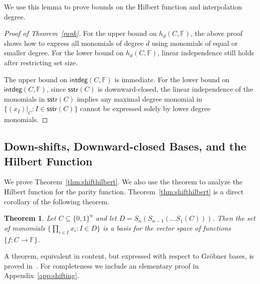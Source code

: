 \documentclass[11pt]{article}
\newtheorem{theorem}{Theorem}[section]
\theoremstyle{definition}
\newcommand{\1}{\mathbf{1}}
\newcommand{\F}{{\mathbb F}}
\newcommand{\sstr}{\mathsf{sstr}}
\newcommand{\setof}[1]{#1}
\newcommand{\intdeg}{\mathsf{intdeg}}
\begin{document}
We use this lemma to prove bounds on the Hilbert function and interpolation degree. 
\begin{proof}[Proof of Theorem~\ref{rank}]   For the upper bound on $h_d(C,\F)$, the above proof shows how to express all monomials of degree $d$ using monomials of equal or smaller degree.   For the lower bound on $h_d(C,\F)$,  linear independence still holds after restricting set size. 

The upper bound on $\intdeg(C,\F)$ is immediate. For the lower bound on $\intdeg(C,\F)$,  since $\sstr(C)$ is downward-closed, the linear independence of the monomials in $\sstr(C)$ implies any maximal degree monomial in $\{(x_I)|_C : I\in\sstr(C)\}$ cannot be expressed solely by  lower degree monomials.  
\end{proof}


\subsection{Down-shifts, Downward-closed Bases, and the Hilbert Function}\label{sec:shift}


We prove Theorem~\ref{thm:shifthilbert}.  
We also use the theorem to analyze the Hilbert function for the parity function. 
Theorem~\ref{thm:shifthilbert} is a direct corollary of the following theorem.
\begin{theorem}\label{thm:shifting}
Let $C\subseteq\{0,1\}^n$ and let $D=S_{n}(S_{n-1}(\ldots S_{1}(C)))$.
Then the set of monomials $\{\prod_{i\in I} x_i  :  I\in \setof{D}\}$
is a basis for the vector space of functions $\{f:C\rightarrow \F\}$.
\end{theorem}
\noindent A theorem, equivalent in content, but expressed with respect to  Gr\"{o}bner bases, is proved in~\cite{Meszaros_thesis}. For completeness we include an elementary proof in Appendix~\ref{app:shifting}.
\end{document}
